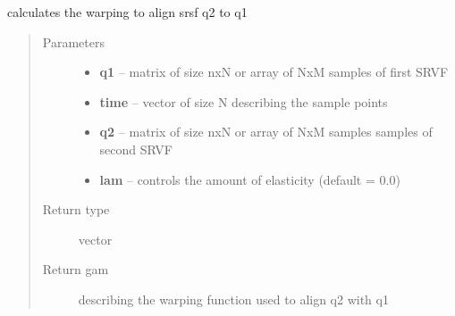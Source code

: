 \documentclass[letterpaper,10pt,english]{sphinxmanual}
\begin{document}
\begin{fulllineitems}
\label{curve_functions:curve_functions.optimum_reparam_curve}
calculates the warping to align srsf q2 to q1
\begin{quote}\begin{description}
\item[{Parameters}] \leavevmode\begin{itemize}
\item {} 
\textbf{q1} -- matrix of size nxN or array of NxM samples of first SRVF

\item {} 
\textbf{time} -- vector of size N describing the sample points

\item {} 
\textbf{q2} -- matrix of size nxN or array of NxM samples samples of second SRVF

\item {} 
\textbf{lam} -- controls the amount of elasticity (default = 0.0)

\end{itemize}

\item[{Return type}] \leavevmode
vector

\item[{Return gam}] \leavevmode
describing the warping function used to align q2 with q1

\end{description}\end{quote}

\end{fulllineitems}

\end{document}
